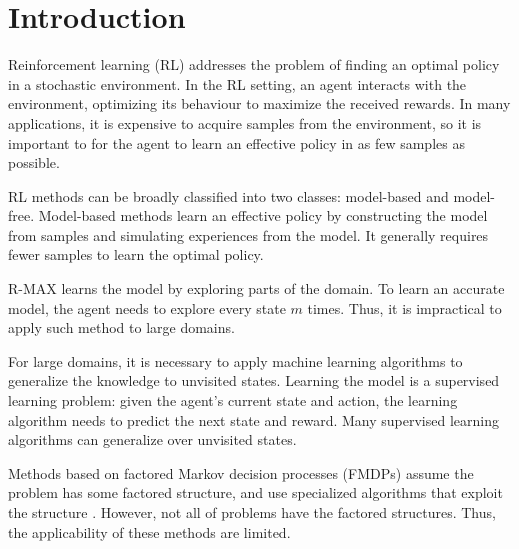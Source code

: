 

\chapter{Introduction}
\label{ch:intro}

Reinforcement learning (RL) addresses the problem of finding an optimal policy in a stochastic environment.
In the RL setting, an agent interacts with the environment, optimizing its behaviour to
maximize the received rewards. In many applications, it is expensive to 
acquire samples from the environment, so it is important to for the agent 
to learn an effective policy in as few samples as possible. 

RL methods can be broadly classified into two classes: model-based and
model-free.
Model-based methods learn an effective policy by
constructing the model from samples and simulating experiences from the model. It
generally requires fewer samples to learn the optimal policy.

R-MAX \cite{RMaxQ} learns the model by exploring parts of the domain.
To learn an accurate model, the agent needs to explore every state $m$ times.
Thus, it is impractical to apply such method to large domains.


For large domains, it is necessary to apply machine learning algorithms to generalize
the knowledge to unvisited states. Learning the model is a supervised learning problem:
given the agent's current state and action, the learning algorithm needs to predict
the next state and reward. Many supervised learning algorithms can generalize 
over unvisited states. 


Methods based on factored Markov decision processes (FMDPs) assume the problem has some factored structure, and use 
specialized algorithms that exploit the structure \cite{ApproxFactor, SPUDD, Wynkoop08, Walsh09}. 
However, not all of problems have the factored structures. Thus, the applicability of these
methods are limited.

